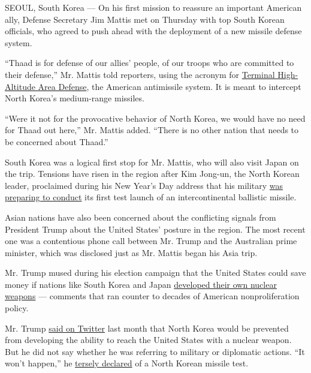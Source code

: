 SEOUL, South Korea --- On his first mission to reassure an important
American ally, Defense Secretary Jim Mattis met on Thursday with top
South Korean officials, who agreed to push ahead with the deployment of
a new missile defense system.

``Thaad is for defense of our allies' people, of our troops who are
committed to their defense,'' Mr. Mattis told reporters, using the
acronym for \href{https://www.mda.mil/system/thaad.html}{Terminal
High-Altitude Area Defense}, the American antimissile system. It is
meant to intercept North Korea's medium-range missiles.

``Were it not for the provocative behavior of North Korea, we would have
no need for Thaad out here,'' Mr. Mattis added. ``There is no other
nation that needs to be concerned about Thaad.''

South Korea was a logical first stop for Mr. Mattis, who will also visit
Japan on the trip. Tensions have risen in the region after Kim Jong-un,
the North Korean leader, proclaimed during his New Year's Day address
that his military
\href{https://www.nytimes.com/2017/01/01/world/asia/north-korea-intercontinental-ballistic-missile-test-kim-jong-un.html}{was
preparing to conduct} its first test launch of an intercontinental
ballistic missile.

Asian nations have also been concerned about the conflicting signals
from President Trump about the United States' posture in the region. The
most recent one was a contentious phone call between Mr. Trump and the
Australian prime minister, which was disclosed just as Mr. Mattis began
his Asia trip.

Mr. Trump mused during his election campaign that the United States
could save money if nations like South Korea and Japan
\href{http://cnnpressroom.blogs.cnn.com/2016/03/29/full-rush-transcript-donald-trump-cnn-milwaukee-republican-presidential-town-hall/}{developed
their own nuclear weapons} --- comments that ran counter to decades of
American nonproliferation policy.

Mr. Trump
\href{https://twitter.com/realDonaldTrump/status/816057920223846400}{said
on Twitter} last month that North Korea would be prevented from
developing the ability to reach the United States with a nuclear weapon.
But he did not say whether he was referring to military or diplomatic
actions. ``It won't happen,'' he
\href{https://www.nytimes.com/2017/01/02/world/asia/trump-twitter-north-korea-missiles-china.html}{tersely
declared} of a North Korean missile test.

